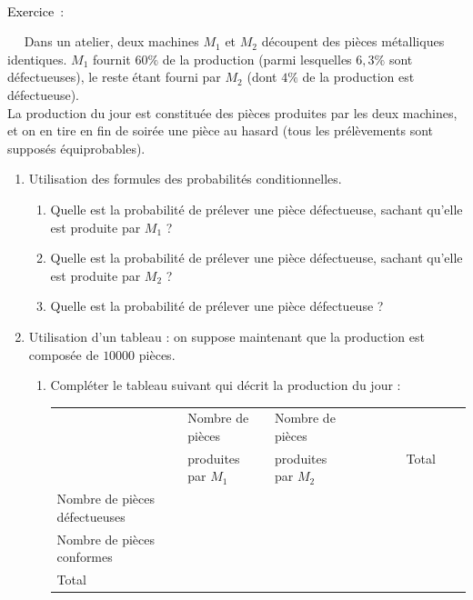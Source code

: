 \documentclass[11pt,a4paper]{article}
\newcounter{numexos}%
\newcommand{\exercice}[1]{%
\addtocounter{numexos}{1}%
\textcolor{black}{\normalsize Exercice\,\thenumexos\,}\,#1%
}
\newcommand{\bex}[2]
{\begin{bclogo}[couleur = white,logo= , barre=none,  arrondi = 0.1]
{~\exercice:~~{#1}}
~~
{#2}
~~
\end{bclogo}}
\begin{document}
\bex{}{
   Dans un atelier, deux machines $M_1$ et $M_2$ découpent des pièces métalliques identiques. $M_1$ fournit $60\%$ de la production (parmi lesquelles $6,3\%$ sont défectueuses), le reste étant fourni par $M_2$ (dont $4\%$ de la production est défectueuse).\\
   La production du jour est constituée des pièces produites par les deux machines, et on en tire en fin de soirée une pièce au hasard (tous les prélèvements sont supposés équiprobables).}
   \begin{enumerate}
      \item Utilisation des formules des probabilités conditionnelles.
      \begin{enumerate}
          \item Quelle est la probabilité de prélever une pièce défectueuse, sachant qu'elle est produite par $M_1$ ?
          
           
          \dotfill 
          \item Quelle est la probabilité de prélever une pièce défectueuse, sachant qu'elle est produite par $M_2$ ?
        
           
          \dotfill 
          \item Quelle est la probabilité de prélever une pièce défectueuse ?
           
          \dotfill 
       \end{enumerate}
       \item Utilisation d'un tableau : 
       on suppose maintenant que la production est composée de $10000$ pièces.
       \begin{enumerate}
          \item Compléter le tableau suivant qui décrit la production du jour : \\
             \begin{tabular}{|l|l|l|l|}
                 \hline
                   & Nombre de pièces    & Nombre de pièces & \\
                
                & produites par $M_1$   & produites par $M_2$ & ~~~~~~~Total ~~~~~~~\\
                 \hline
                Nombre de pièces défectueuses & & & \\
                 \hline
                Nombre de pièces conformes & & & \\
                 \hline
                Total & & & \\
                 \hline
             \end{tabular}
             \vspace{1mm}


\end{enumerate}
\end{enumerate}
\end{document}
